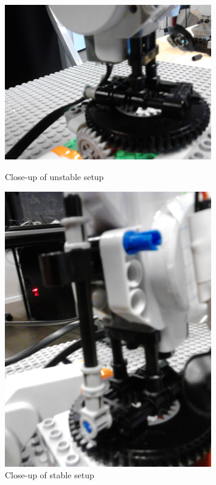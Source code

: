 \begin{figure}[H]
    \begin{minipage}{0.5\textwidth}
	\centering
	    \includegraphics[width=0.80\textwidth]{graphics/rig/rig_standing_unstable.jpg}
	    \caption{Close-up of unstable setup}
	    \label{fig:rig_unstable}
    \end{minipage}%
	\begin{minipage}{0.5\textwidth}
		\centering
	    \includegraphics[width=0.80\textwidth]{graphics/rig/rig_standing_stable.jpg}
	    \caption{Close-up of stable setup}
	    \label{fig:rig_stable}
	\end{minipage}
\end{figure}

